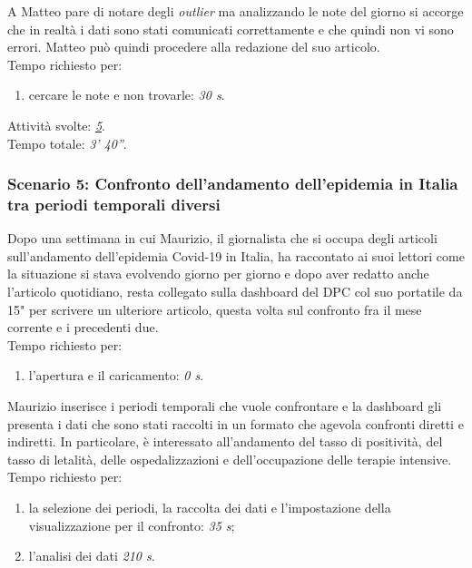 \noindent
A Matteo pare di notare degli \textit{outlier} ma analizzando le note del giorno si accorge che in realtà i dati sono stati comunicati correttamente e che quindi non vi sono errori. Matteo può quindi procedere alla redazione del suo articolo.\\
Tempo richiesto per:
\begin{enumerate}
    \item cercare le note e non trovarle: \textit{30 s}.
\end{enumerate}

\noindent
Attività svolte: \hyperref[itm:5]{\textit{5}}.\\  
Tempo totale: \textit{3' 40''}. 

\subsubsection{Scenario 5: Confronto dell'andamento dell'epidemia in Italia tra periodi temporali diversi}
Dopo una settimana in cui Maurizio, il giornalista che si occupa degli articoli sull'andamento dell'epidemia Covid-19 in Italia, ha raccontato ai suoi lettori come la situazione si stava evolvendo giorno per giorno e dopo aver redatto anche l'articolo quotidiano, resta collegato sulla dashboard del DPC col suo portatile da 15" per scrivere un ulteriore articolo, questa volta sul confronto fra il mese corrente e i precedenti due.\\
Tempo richiesto per:
\begin{enumerate}
    \item l'apertura e il caricamento: \textit{0 s}.
\end{enumerate}

\noindent
Maurizio inserisce i periodi temporali che vuole confrontare e la dashboard gli presenta i dati che sono stati raccolti in un formato che agevola confronti diretti e indiretti. In particolare, è interessato all'andamento del tasso di positività, del tasso di letalità, delle ospedalizzazioni e dell'occupazione delle terapie intensive.\\
Tempo richiesto per:
\begin{enumerate}
    \item la selezione dei periodi, la raccolta dei dati e l'impostazione della visualizzazione per il confronto: \textit{35 s};
    \item l'analisi dei dati \textit{210 s}.
\end{enumerate}

